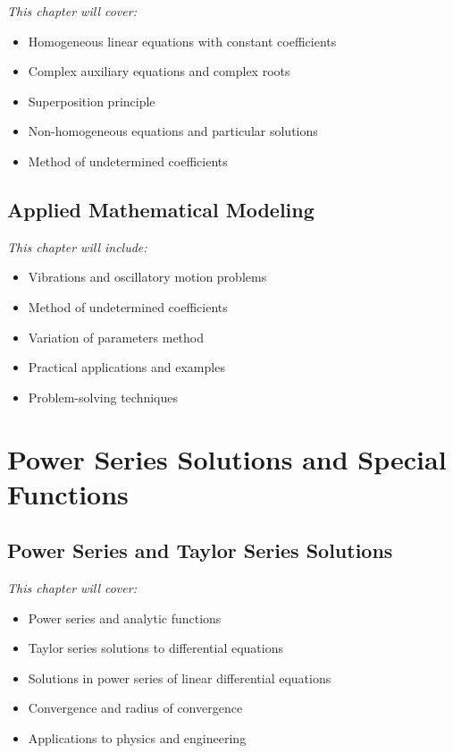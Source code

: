 \documentclass[12pt, letterpaper]{book}
\begin{document}
\textit{This chapter will cover:}
\begin{itemize}
    \item Homogeneous linear equations with constant coefficients
    \item Complex auxiliary equations and complex roots
    \item Superposition principle
    \item Non-homogeneous equations and particular solutions
    \item Method of undetermined coefficients
\end{itemize}

\chapter{Applied Mathematical Modeling}
\label{chap:session_7}

\textit{This chapter will include:}
\begin{itemize}
    \item Vibrations and oscillatory motion problems
    \item Method of undetermined coefficients
    \item Variation of parameters method
    \item Practical applications and examples
    \item Problem-solving techniques
\end{itemize}

\part{Power Series Solutions and Special Functions}
\label{part:power_series_special_functions}

\chapter{Power Series and Taylor Series Solutions}
\label{chap:session_8}

\textit{This chapter will cover:}
\begin{itemize}
    \item Power series and analytic functions
    \item Taylor series solutions to differential equations
    \item Solutions in power series of linear differential equations
    \item Convergence and radius of convergence
    \item Applications to physics and engineering
\end{itemize}
\end{document}
